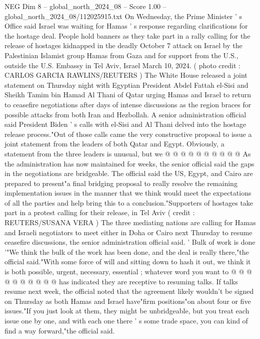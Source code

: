 \begin{textsample}{NEG Dim 8 – global\_north\_2024\_08 – Score 1.00 – global\_north\_2024\_08/112025915.txt}  \label{ex:f8_neg_425}
On Wednesday, the Prime Minister ' s Office said Israel was waiting for Hamas ' s response regarding clarifications for the hostage deal.
People hold banners as they take part in a rally calling for the release of hostages kidnapped in the deadly October 7 attack on Israel by the Palestinian Islamist group Hamas from Gaza and for support from the U.S., outside the U.S.
Embassy in Tel Aviv, Israel March 10, 2024. ( photo credit : CARLOS GARCIA RAWLINS/REUTERS ) The White House released a joint statement on Thursday night with Egyptian President Abdel Fattah el-Sisi and Sheikh Tamim bin Hamad Al Thani of Qatar urging Hamas and Israel to return to ceasefire negotiations after days of intense discussions as the region braces for possible attacks from both Iran and Hezbollah.
A senior administration official said President Biden ' s calls with el-Sisi and Al Thani delved into the hostage release process."Out of those calls came the very constructive proposal to issue a joint statement from the leaders of both Qatar and Egypt.
Obviously, a statement from the three leaders is unusual, but we @ @ @ @ @ @ @ @ @ @ As the administration has now maintained for weeks, the senior official said the gaps in the negotiations are bridgeable.
The official said the US, Egypt, and Cairo are prepared to present"a final bridging proposal to really resolve the remaining implementation issues in the manner that we think would meet the expectations of all the parties and help bring this to a conclusion."Supporters of hostages take part in a protest calling for their release, in Tel Aviv ( credit : REUTERS/SUSANA VERA ) The three mediating nations are calling for Hamas and Israeli negotiators to meet either in Doha or Cairo next Thursday to resume ceasefire discussions, the senior administration official said. ' Bulk of work is done '"We think the bulk of the work has been done, and the deal is really there,"the official said."With some force of will and sitting down to hash it out, we think it is both possible, urgent, necessary, essential ; whatever word you want to @ @ @ @ @ @ @ @ @ @ has indicated they are receptive to resuming talks.
If talks resume next week, the official noted that the agreement likely wouldn't be signed on Thursday as both Hamas and Israel have"firm positions"on about four or five issues."If you just look at them, they might be unbridgeable, but you treat each issue one by one, and with each one there ' s some trade space, you can kind of find a way forward,"the official said.

\end{textsample}
